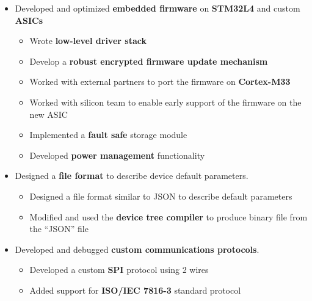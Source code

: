 \documentclass[10pt,a4paper]{altacv}
\begin{document}
\begin{paracol}{2}


\begin{itemize}
\item Developed and optimized \textbf{\textcolor{bold}{embedded firmware}} on \textbf{\textcolor{bold}{STM32L4}} and custom \textbf{\textcolor{bold}{ASICs}}
\begin{itemize}
    \renewcommand{\labelitemii}{-} %
    \item Wrote \textbf{\textcolor{bold}{low-level driver stack}}
    \item Develop a \textbf{\textcolor{bold}{robust encrypted firmware update mechanism}}
    \item Worked with external partners to port the firmware on \textbf{\textcolor{bold}{Cortex-M33}}
    \item Worked with silicon team to enable early support of the firmware on the new ASIC
    \item Implemented a \textbf{\textcolor{bold}{fault safe}} storage module
    \item Developed \textbf{\textcolor{bold}{power management}} functionality
\end{itemize}
\item Designed a \textbf{\textcolor{bold}{file format}} to describe device default parameters.
\begin{itemize}
    \renewcommand{\labelitemii}{-} %
    \item Designed a file format similar to JSON to describe default parameters
    \item Modified and used the \textbf{\textcolor{bold}{device tree compiler}} to produce binary file from the “JSON” file
\end{itemize}
\item Developed and debugged \textbf{\textcolor{bold}{custom communications protocols}}.
\begin{itemize}
    \renewcommand{\labelitemii}{-} %
    \item Developed a custom \textbf{\textcolor{bold}{SPI}} protocol using 2 wires 
    \item Added support for \textbf{\textcolor{bold}{ISO/IEC 7816-3}} standard protocol

\end{itemize}
\end{itemize}
\end{paracol}
\end{document}
